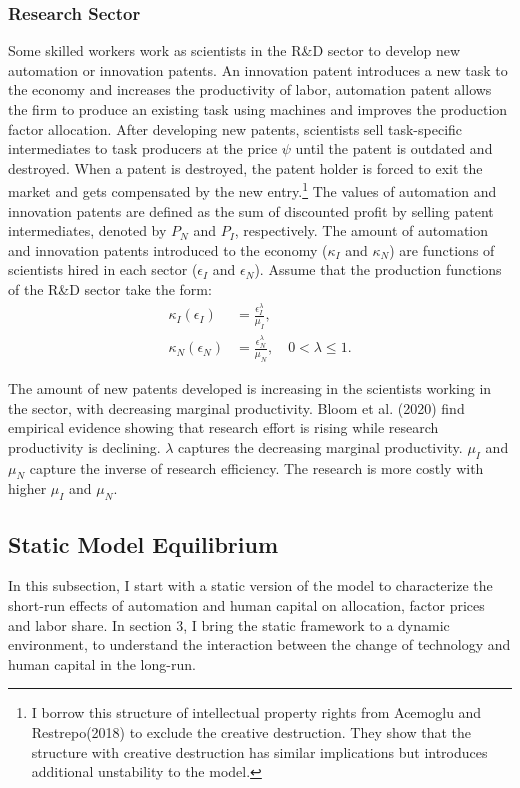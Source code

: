 \documentclass[12pt]{article}
\begin{document}
\subsubsection*{Research Sector}
Some skilled workers work as scientists in the R\&D sector to develop new automation or innovation patents. An innovation patent introduces a new task to the economy and increases the productivity of labor, automation patent allows the firm to produce an existing task using machines and improves the production factor allocation. After developing new patents, scientists sell task-specific intermediates to task producers at the price $\psi$ until the patent is outdated and destroyed. When a patent is destroyed, the patent holder is forced to exit the market and gets compensated by the new entry.\footnote{I borrow this structure of intellectual property rights from Acemoglu and Restrepo(2018)\nocite{AcemogluRestrepo2018} to exclude the creative destruction. They show that the structure with creative destruction has similar implications but introduces additional unstability to the model.} The values of automation and innovation patents are defined as the sum of discounted profit by selling patent intermediates, denoted by $P_N$ and $P_I$, respectively. The amount of automation and innovation patents introduced to the economy ($\kappa_I$ and $\kappa_N$) are functions of scientists hired in each sector ($\epsilon_I$ and $\epsilon_N$).
Assume that the production functions of the R\&D sector take the form: 
\begin{align}
\label{kappa_I}
\kappa_I(\epsilon_I) &= \frac{\epsilon_I^\lambda}{\mu_I}, \\
\label{kappa_N}
\kappa_N(\epsilon_N) &= \frac{\epsilon_N^\lambda}{\mu_N}, \quad 0<\lambda\leq 1.
\end{align}

The amount of new patents developed is increasing in the scientists working in the sector, with decreasing marginal productivity. Bloom et al. (2020)\nocite{Bloometal2020} find empirical evidence showing that research effort is rising while research productivity is declining. $\lambda$ captures the decreasing marginal productivity. $\mu_I$ and $\mu_N$ capture the inverse of research efficiency. The research is more costly with higher $\mu_I$ and $\mu_N$. 

\subsection{Static Model Equilibrium}
In this subsection, I start with a static version of the model to characterize the short-run effects of automation and human capital on allocation, factor prices and labor share. In section 3, I bring the static framework to a dynamic environment, to understand the interaction between the change of technology and human capital in the long-run. 
\end{document}
